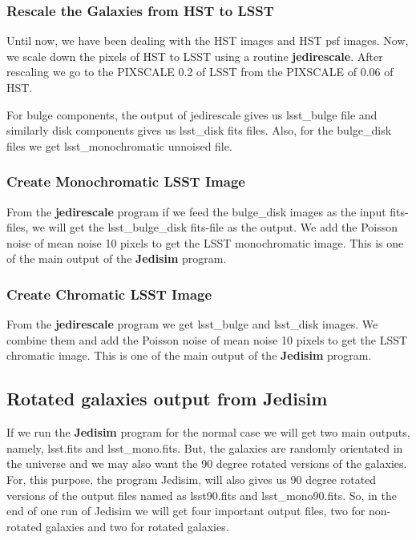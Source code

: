 \subsubsection{Rescale the Galaxies from HST to LSST}
Until now, we have been dealing with the HST images and HST psf images. Now, we scale down the pixels of HST to LSST using a routine \textbf{jedirescale}. After rescaling we go to the PIXSCALE 0.2 of LSST from the PIXSCALE of 0.06 of HST.

For bulge components, the output of jedirescale gives us lsst\_bulge file and similarly disk components gives us lsst\_disk fits files. Also, for the bulge\_disk files we get lsst\_monochromatic unnoised file.

\subsubsection{Create Monochromatic LSST Image}
From the \textbf{jedirescale} program if we feed the bulge\_disk images as the input fits-files, we will get the lsst\_bulge\_disk fits-file as the output. We add the Poisson noise of mean noise 10 pixels to get the LSST monochromatic image.
This is one of the main output of the \textbf{Jedisim} program.

\subsubsection{Create Chromatic LSST Image}
From the \textbf{jedirescale} program we get lsst\_bulge and lsst\_disk images. We combine them and add the Poisson noise of mean noise 10 pixels to get the LSST chromatic image.
This is one of the main output of the \textbf{Jedisim} program.

\subsection{Rotated galaxies output from Jedisim}
If we run the \textbf{Jedisim} program for the normal case we will get two main outputs, namely, lsst.fits and lsst\_mono.fits. But, the galaxies are randomly orientated in the 
universe and we may also want the 90 degree rotated versions of the galaxies. For, this purpose, the program Jedisim, will also gives us 90 degree rotated versions of the output files named as lsst90.fits and lsst\_mono90.fits. So, in the end of one run of Jedisim we will get four important output files, two for non-rotated galaxies and two for rotated galaxies.